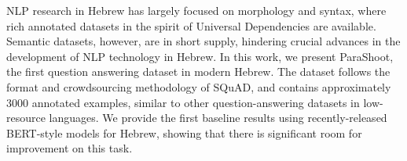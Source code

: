 NLP research in Hebrew has largely focused on morphology and syntax, where rich annotated datasets in the spirit of Universal Dependencies are available. Semantic datasets, however, are in short supply, hindering crucial advances in the development of NLP technology in Hebrew. In this work, we present ParaShoot, the first question answering dataset in modern Hebrew. The dataset follows the format and crowdsourcing methodology of SQuAD, and contains approximately 3000 annotated examples, similar to other question-answering datasets in low-resource languages. We provide the first baseline results using recently-released BERT-style models for Hebrew, showing that there is significant room for improvement on this task.
